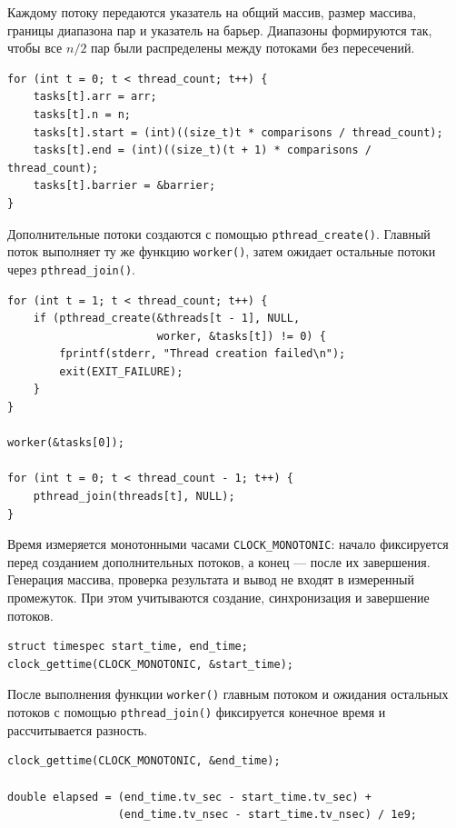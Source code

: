 \documentclass[12pt,a4paper]{article}
\begin{document}
\Needspace{0.32\textheight}
Каждому потоку передаются указатель на общий массив, размер массива, границы диапазона пар и указатель на барьер. Диапазоны формируются так, чтобы все $n/2$ пар были распределены между потоками без пересечений.

\begin{lstlisting}[style=cstyle,caption={Распределение диапазонов между потоками}]
for (int t = 0; t < thread_count; t++) {
    tasks[t].arr = arr;
    tasks[t].n = n;
    tasks[t].start = (int)((size_t)t * comparisons / thread_count);
    tasks[t].end = (int)((size_t)(t + 1) * comparisons / thread_count);
    tasks[t].barrier = &barrier;
}
\end{lstlisting}

Дополнительные потоки создаются с помощью \texttt{pthread\_create()}. Главный поток выполняет ту же функцию \texttt{worker()}, затем ожидает остальные потоки через \texttt{pthread\_join()}.

\begin{lstlisting}[style=cstyle,caption={Создание потоков и ожидание их завершения}]
for (int t = 1; t < thread_count; t++) {
    if (pthread_create(&threads[t - 1], NULL,
                       worker, &tasks[t]) != 0) {
        fprintf(stderr, "Thread creation failed\n");
        exit(EXIT_FAILURE);
    }
}

worker(&tasks[0]);

for (int t = 0; t < thread_count - 1; t++) {
    pthread_join(threads[t], NULL);
}
\end{lstlisting}

\Needspace{0.31\textheight}
Время измеряется монотонными часами \texttt{CLOCK\_MONOTONIC}: начало фиксируется перед созданием дополнительных потоков, а конец --- после их завершения. Генерация массива, проверка результата и вывод не входят в измеренный промежуток. При этом учитываются создание, синхронизация и завершение потоков.

\begin{lstlisting}[style=cstyle,caption={Начало измерения времени}]
struct timespec start_time, end_time;
clock_gettime(CLOCK_MONOTONIC, &start_time);
\end{lstlisting}

После выполнения функции \texttt{worker()} главным потоком и ожидания остальных потоков с помощью \texttt{pthread\_join()} фиксируется конечное время и рассчитывается разность.

\begin{lstlisting}[style=cstyle,caption={Окончание измерения времени}]
clock_gettime(CLOCK_MONOTONIC, &end_time);

double elapsed = (end_time.tv_sec - start_time.tv_sec) +
                 (end_time.tv_nsec - start_time.tv_nsec) / 1e9;
\end{lstlisting}
\end{document}
